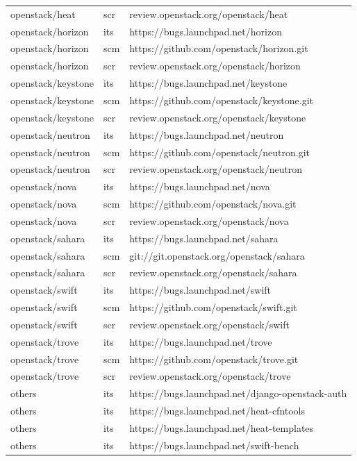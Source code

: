 \documentclass[a4wide,11pt]{report}
\begin{document}
\begin{center}
\begin{longtable}{|p{4cm}|p{1cm}|p{10cm}|}
openstack/heat&scr&review.openstack.org/openstack/heat\\ 
openstack/horizon&its&https://bugs.launchpad.net/horizon\\ 
openstack/horizon&scm&https://github.com/openstack/horizon.git\\ 
openstack/horizon&scr&review.openstack.org/openstack/horizon\\ 
openstack/keystone&its&https://bugs.launchpad.net/keystone\\ 
openstack/keystone&scm&https://github.com/openstack/keystone.git\\ 
openstack/keystone&scr&review.openstack.org/openstack/keystone\\ 
openstack/neutron&its&https://bugs.launchpad.net/neutron\\ 
openstack/neutron&scm&https://github.com/openstack/neutron.git\\ 
openstack/neutron&scr&review.openstack.org/openstack/neutron\\ 
openstack/nova&its&https://bugs.launchpad.net/nova\\ 
openstack/nova&scm&https://github.com/openstack/nova.git\\ 
openstack/nova&scr&review.openstack.org/openstack/nova\\ 
openstack/sahara&its&https://bugs.launchpad.net/sahara\\ 
openstack/sahara&scm&git://git.openstack.org/openstack/sahara\\ 
openstack/sahara&scr&review.openstack.org/openstack/sahara\\ 
openstack/swift&its&https://bugs.launchpad.net/swift\\ 
openstack/swift&scm&https://github.com/openstack/swift.git\\ 
openstack/swift&scr&review.openstack.org/openstack/swift\\ 
openstack/trove&its&https://bugs.launchpad.net/trove\\ 
openstack/trove&scm&https://github.com/openstack/trove.git\\ 
openstack/trove&scr&review.openstack.org/openstack/trove\\ 
others&its&https://bugs.launchpad.net/django-openstack-auth\\ 
others&its&https://bugs.launchpad.net/heat-cfntools\\ 
others&its&https://bugs.launchpad.net/heat-templates\\ 
others&its&https://bugs.launchpad.net/swift-bench\\ 

\end{longtable}
\end{center}
\end{document}
